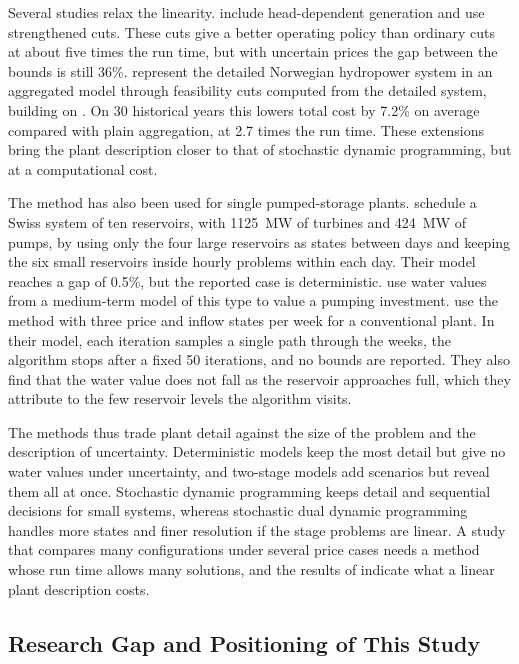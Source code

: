Several studies relax the linearity. \citet{hjelmeland2019energies}
include head-dependent generation and use strengthened cuts. These cuts
give a better operating policy than ordinary cuts at about five times
the run time, but with uncertain prices the gap between the bounds is
still 36\%. \citet{helseth2024approximating} represent the detailed
Norwegian hydropower system in an aggregated model through feasibility
cuts computed from the detailed system, building on
\citet{helseth2023hydropowera}. On 30 historical years this lowers total
cost by 7.2\% on average compared with plain aggregation, at 2.7 times
the run time. These extensions bring the plant description closer to
that of stochastic dynamic programming, but at a computational cost.

The method has also been used for single pumped-storage plants.
\citet{abgottspon2016multihorizon} schedule a Swiss system of ten
reservoirs, with \SI{1125}{\mega\watt} of turbines and
\SI{424}{\mega\watt} of pumps, by using only the four large reservoirs
as states between days and keeping the six small reservoirs inside
hourly problems within each day. Their model reaches a gap of 0.5\%, but the
reported case is deterministic. \citet{schuller2024practical} use water
values from a medium-term model of this type to value a pumping
investment. \citet{bore2026assessing} use the method with three price
and inflow states per week for a conventional plant. In their model,
each iteration samples a single path through the weeks, the algorithm
stops after a fixed 50 iterations, and no bounds are reported. They also
find that the water value does not fall as the reservoir approaches
full, which they attribute to the few reservoir levels the algorithm
visits.

The methods thus trade plant detail against the size of the problem and
the description of uncertainty. Deterministic models keep the most
detail but give no water values under uncertainty, and two-stage models
add scenarios but reveal them all at once. Stochastic dynamic
programming keeps detail and sequential decisions for small systems,
whereas stochastic dual dynamic programming handles more states and
finer resolution if the stage problems are linear. A study that
compares many configurations under several price cases needs a method
whose run time allows many solutions, and the results of
\citet{helseth2017iet} indicate what a linear plant description costs.

\subsection{Research Gap and Positioning of This Study}
\label{sec:lit_gap}

